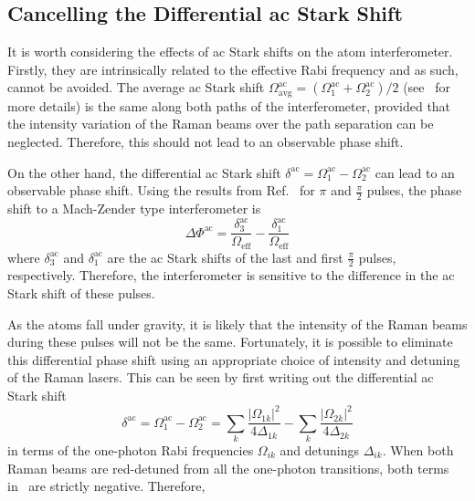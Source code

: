 \subsection{Cancelling the Differential ac Stark
Shift}\label{subsec:light_shift}
It is worth considering the effects of ac Stark shifts on the atom
interferometer. Firstly, they are intrinsically related to the
effective Rabi frequency and as such, cannot be avoided. The average
ac Stark shift \(\Omega^\text{ac}_\text{avg} = (\Omega_1^\text{ac} +
\Omega_2^\text{ac})/2 \) (see~ for more
details) is
the same along both paths of the interferometer, provided that the
intensity variation of the Raman beams over the path separation can be
neglected. Therefore, this should not lead to an observable phase
shift.
\par\noindent
On the other hand, the differential ac Stark shift \(\delta^\text{ac}
= \Omega_1^\text{ac} - \Omega_2^\text{ac}\) can lead to an observable
phase shift. Using the results from Ref.~\cite{Weiss1994} for \(\pi\)
and \(\frac{\pi}{2}\) pulses, the phase shift to a Mach-Zender type
interferometer is
\begin{equation}
  \Delta \Phi^\text{ac} =
  \frac{\delta_3^\text{ac}}{\Omega_\text{eff}} - \frac{\delta_1^\text{ac}}{\Omega_\text{eff}} 
 \label{eq:diff_phase}
\end{equation}
where \(\delta_3^\text{ac}\) and \(\delta_1^\text{ac}\) are the ac
Stark shifts of the last and first \(\frac{\pi}{2}\) pulses,
respectively. Therefore, the interferometer is sensitive to the
difference in the ac Stark shift of these pulses. 
\par\noindent
As the atoms fall
under gravity, it is likely that the intensity of the Raman beams
during these pulses will not be the same. Fortunately, it is possible
to eliminate this differential phase shift using an appropriate choice
of intensity and detuning of the Raman lasers. This can be seen by
first writing out the differential ac Stark shift
\begin{equation}
  \delta^\text{ac} = \Omega_1^\text{ac} - \Omega_2^\text{ac} = \sum_{k}
  \frac{\lvert\Omega_{1k}\rvert^2}{4\Delta_{1k}} - \sum_{k}
  \frac{\lvert\Omega_{2k}\rvert^2}{4\Delta_{2k}} 
  \label{eq:diff_shift}
\end{equation}
in terms of the one-photon Rabi frequencies \(\Omega_{ik}\) and
detunings \(\Delta_{ik}\). When both Raman beams are red-detuned from
all the one-photon transitions, both terms
in~ are strictly negative. Therefore,
